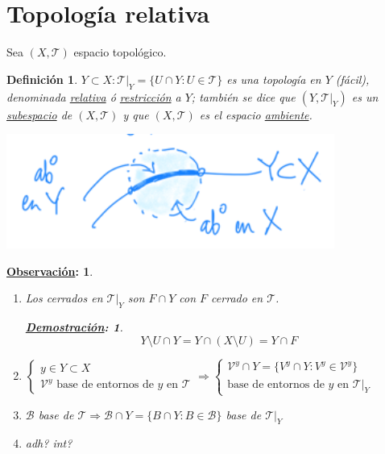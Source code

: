 \documentclass[10pt,a4paper,openright]{book}
\theoremstyle{break}
\newtheorem*{defi}{Definición}
\newtheorem*{demo}{\underline{Demostración}:}
\newtheorem*{obs}{\underline{Observación}:}
\begin{document}
\section{Topología relativa}%
\label{sec:topologia_relativa}
Sea $\left( X, \mathcal{T} \right)$ espacio topológico.
\begin{defi}
$Y \subset X: \mathcal{T}|_Y = \{U \cap Y: U \in \mathcal{T}\}$ es una topología en $Y$ (fácil), denominada \underline{relativa} ó \underline{restricción} a $Y$; también se dice que $\left( Y, \mathcal{T}|_Y \right)$ es un \underline{subespacio} de $\left( X, \mathcal{T} \right)$ y que $\left( X, \mathcal{T} \right)$ es el espacio \underline{ambiente}. 
\begin{center}
    \includegraphics[scale=0.3]{images/def_subespacio_top} 
\end{center}
\end{defi}

\begin{obs}
\begin{enumerate}
    \item Los cerrados en $\mathcal{T}|_Y$ son $F\cap Y$ con $F$ cerrado en $\mathcal{T}$.
    \begin{demo}
    \[
    Y \setminus U \cap Y = Y \cap \left( X \setminus U \right) = Y\cap F
    \]
    \end{demo}
    \item 
    $\begin{cases}
        y \in Y \subset X\\
        \mathcal{V}^y \text{ base de entornos de } y \text{ en } \mathcal{T} 
    \end{cases}\Rightarrow \begin{cases}
        \mathcal{V}^y \cap Y = \{V^y \cap Y : V^y \in \mathcal{V}^y\} \\
        \text{base de entornos de } y \text{ en } \mathcal{T}|_Y 
    \end{cases}$

    \item $\mathcal{B}$ base de $\mathcal{T} \Rightarrow \mathcal{B} \cap Y = \{B \cap Y : B \in \mathcal{B}\}$ base de $\mathcal{T}|_Y$

    \item adh? int?
\end{enumerate}
\end{obs}
\end{document}
